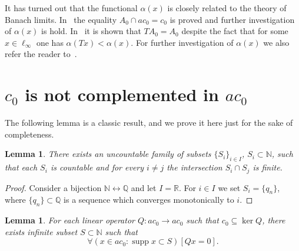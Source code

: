 \documentclass[a4paper,14pt]{article} %
\DeclareMathOperator{\supp}{supp}
\theoremstyle{plain}
\newtheorem{lemma}[theorem]{Lemma}
\theoremstyle{definition}
\begin{document}
It has turned out that the functional $\alpha(x)$ is closely related to the theory of Banach limits.
In~\cite{avdeev2019space} the equality $A_0\cap ac_0 = c_0$ is proved and further investigation of $\alpha(x)$ is hold.
In~\cite{our-ped-2018-alpha-Tx} it is shown that $TA_0 = A_0$ despite the fact that for some $x\in\ell_\infty$
one has $\alpha(Tx)<\alpha(x)$.
For further investigation of $\alpha(x)$ we also refer the reader to~\cite{avdeev2021subsets}.

\section{$c_0$ is not complemented in $ac_0$}
\label{sec:c0_in_ac0}

The following lemma is a classic result, and we prove it here just for the sake of completeness.
\begin{lemma}
	\label{lem:uncountable_subsets_of_N_with_finite_intersections}
	There exists an uncountable family of subsets
	$\{S_i\}_{i\in I}$, $S_i \subset \mathbb{N}$,
	such that each $S_i$ is countable and for every $i\neq j$ the intersection $S_i \cap S_j$ is finite.
\end{lemma}

\begin{proof}
	Consider a bijection $\mathbb{N} \leftrightarrow \mathbb{Q}$
	and let $I = \mathbb{R}$.
	For $i\in I$ we set $S_i = \{q_n\}$,
	where $\{q_n\} \subset \mathbb{Q}$ is a sequence which converges monotonically to $i$.
\end{proof}









\begin{lemma}
	\label{lem:c_0_not_complemented_in_ac_0}
	For each linear operator $Q: ac_0 \to ac_0$ such that $c_0\subseteq \ker Q$,
	there exists infinite subset $S \subset \mathbb{N}$ such that
	\begin{equation}
		\forall(x \in ac_0 : \supp x \subset S)[Qx = 0]
		.
	\end{equation}
\end{lemma}
\end{document}
